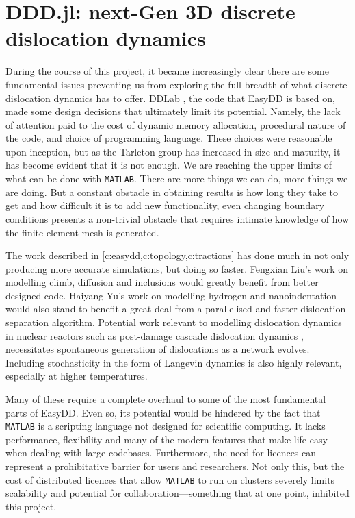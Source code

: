 \chapter{DDD.jl: next-Gen 3D discrete dislocation dynamics}
\label{c:DDDjl}

During the course of this project, it became increasingly clear there are some fundamental issues preventing us from exploring the full breadth of what discrete dislocation dynamics has to offer. \href{http://micro.stanford.edu/wiki/M01_How_to_Obtain_and_Run_DDLab}{DDLab} \cite{ddlab}, the code that EasyDD is based on, made some design decisions that ultimately limit its potential. Namely, the lack of attention paid to the cost of dynamic memory allocation, procedural nature of the code, and choice of programming language. These choices were reasonable upon inception, but as the Tarleton group has increased in size and maturity, it has become evident that it is not enough. We are reaching the upper limits of what can be done with \texttt{MATLAB}. There are more things we can do, more things we are doing. But a constant obstacle in obtaining results is how long they take to get and how difficult it is to add new functionality, even changing boundary conditions presents a non-trivial obstacle that requires intimate knowledge of how the finite element mesh is generated.

The work described in \cref{c:easydd,c:topology,c:tractions} has done much in not only producing more accurate simulations, but doing so faster. Fengxian Liu's work on modelling climb, diffusion and inclusions would greatly benefit from better designed code. Haiyang Yu's work on modelling hydrogen \cite{YU2018} and nanoindentation would also stand to benefit a great deal from a parallelised and faster dislocation separation algorithm. Potential work relevant to modelling dislocation dynamics in nuclear reactors such as post-damage cascade dislocation dynamics \cite{sand2014radiation}, necessitates spontaneous generation of dislocations as a network evolves. Including stochasticity in the form of Langevin dynamics \cite{li2019diffusion} is also highly relevant, especially at higher temperatures.

Many of these require a complete overhaul to some of the most fundamental parts of EasyDD. Even so, its potential would be hindered by the fact that \texttt{MATLAB} is a scripting language not designed for scientific computing. It lacks performance, flexibility and many of the modern features that make life easy when dealing with large codebases. Furthermore, the need for licences can represent a prohibitative barrier for users and researchers. Not only this, but the cost of distributed licences that allow \texttt{MATLAB} to run on clusters severely limits scalability and potential for collaboration---something that at one point, inhibited this project.

